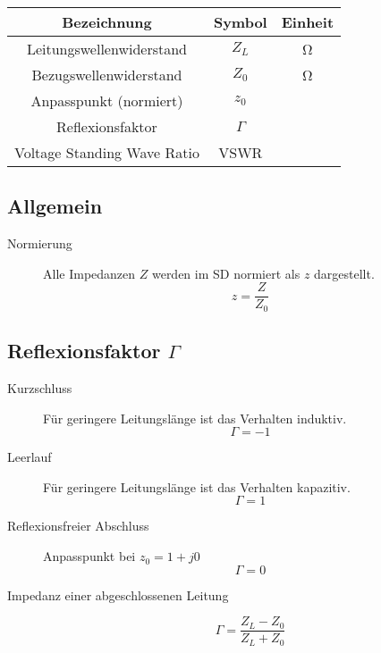 \begin{center}
\begin{tabular}{ccc} \toprule
Bezeichnung & Symbol & Einheit \\ \midrule
Leitungswellenwiderstand & $Z_L$ &  \si{\ohm}\\
Bezugswellenwiderstand & $Z_0$ &  \si{\ohm}\\
Anpasspunkt (normiert) & $z_0$ &  \\
Reflexionsfaktor & $\Gamma$ &  \\
Voltage Standing Wave Ratio & VSWR &  \\
\bottomrule
\end{tabular}
\end{center}

\subsection*{Allgemein}
\begin{description}
\item[Normierung] Alle Impedanzen $Z$ werden im SD normiert als $z$ dargestellt.
\begin{equation*}
z = \frac{Z}{Z_0}
\end{equation*}
\end{description}

\subsection*{Reflexionsfaktor \texorpdfstring{$\Gamma$}{r}}
\begin{description}
\item[Kurzschluss] Für geringere Leitungslänge ist das Verhalten induktiv.
\begin{equation*}
\Gamma = -1
\end{equation*}

\item[Leerlauf] Für geringere Leitungslänge ist das Verhalten kapazitiv.
\begin{equation*}
\Gamma = 1
\end{equation*}

\item[Reflexionsfreier Abschluss] Anpasspunkt bei $z_0 = 1+j0$
\begin{equation*}
\Gamma = 0
\end{equation*}

\item[Impedanz einer abgeschlossenen Leitung]
\begin{equation*}
\Gamma = \frac{Z_L - Z_0}{Z_L + Z_0}
\end{equation*}
\end{description}

